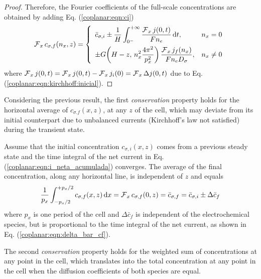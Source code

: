 \begin{proof}
	Therefore, the Fourier coefficients of the full-scale concentrations are obtained by adding Eq. (\ref{coplanar:eqn:ci})
	\begin{equation}
		\operatorname{\mathcal{F}}_{x} c_{\sigma,f}(n_{x},z) =
		\left\{
			\begin{array}{ll}
				\displaystyle
				\bar{c}_{\sigma,i} \pm \frac{1}{H}
				\int_{0^{-}}^{+\infty}
				\frac{\operatorname{\mathcal{F}}_{x} j(0,t)}{F n_{e}}
				\,\mathrm{d}t, & n_{x} = 0
				\\[1em]
				\displaystyle
				\pm G\!\left(H-z,\, n_{x}^{2} \frac{4\pi^{2}}{p_{x}^{2}}\right)
				\frac{\operatorname{\mathcal{F}}_{x} j_{f}(n_{x})}{F n_{e} D_{\sigma}}, & n_{x} \neq 0
			\end{array}
		\right.
	\end{equation}
	where $\operatorname{\mathcal{F}}_{x} j(0,t) = \operatorname{\mathcal{F}}_{x} j(0,t) - \operatorname{\mathcal{F}}_{x} j_{i}(0) = \operatorname{\mathcal{F}}_{x} \Delta j(0,t)$
	due to Eq. (\ref{coplanar:eqn:kirchhoff:inicial}).
\end{proof}

Considering the previous result,
the first \emph{conservation} property holds for the horizontal average of $c_{\sigma.f}(x,z)$, at any $z$ of the cell,
which may deviate from its initial counterpart
due to unbalanced currents (Kirchhoff's law not satisfied) during the transient state.

\begin{corolario}
	\label{coplanar:cor:bar_cf}
	Assume that the initial concentration $c_{\sigma,i}(x,z)$ comes from a previous steady state
	and the time integral of the net current in Eq. (\ref{coplanar:eqn:i_neta_acumulada}) converges.
	The average of the final concentration, along any horizontal line,
	is independent of $z$ and equals 
	\begin{equation}
		\label{coplanar:eqn:bar_cf}
		\frac{1}{p_{x}} \int_{-p_{x}/2}^{+p_{x}/2} c_{\sigma,f}(x,z) \,\mathrm{d}x =
		\operatorname{\mathcal{F}}_{x} c_{\sigma,f}(0,z) =
		\bar{c}_{\sigma,f} =
		\bar{c}_{\sigma,i} \pm \Delta \bar{c}_{f}
	\end{equation}
	where $p_{x}$ is one period of the cell
	and $\Delta \bar{c}_{f}$ is independent of the electrochemical species,
	but is proportional to the time integral of the net current,
	as shown in Eq. (\ref{coplanar:eqn:delta_bar_cf}).
\end{corolario}

The second \emph{conservation} property holds for the weighted sum of concentrations
at any point in the cell,
which translates into the total concentration at any point in the cell
when the diffusion coefficients of both species are equal.

